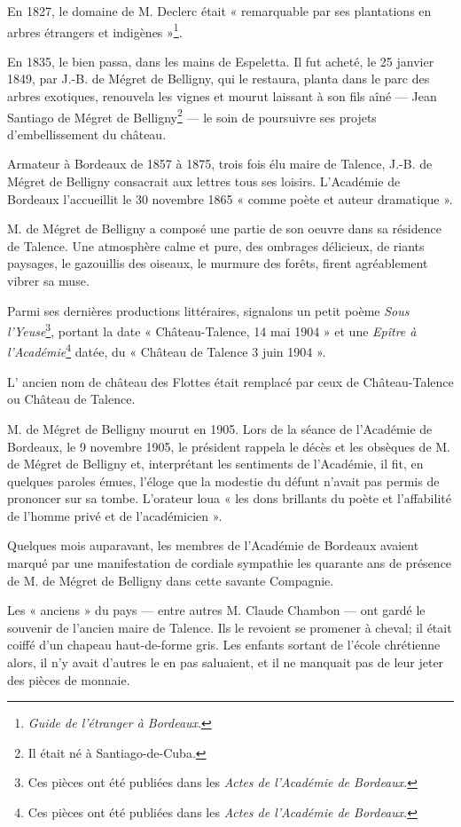 En 1827, le domaine de M. Declerc était « remarquable par ses plantations en arbres étrangers et indigènes »\footnote{\textit{Guide de l'étranger à Bordeaux}.}.

En 1835, le bien passa, dans les mains de Espeletta. Il fut acheté, le 25 janvier 1849, par J.-B. de Mégret de Belligny, qui le restaura, planta dans le parc des arbres exotiques, renouvela les vignes et mourut laissant à son fils aîné — Jean Santiago de Mégret de Belligny\footnote{Il était né à Santiago-de-Cuba.} — le soin de poursuivre ses projets d'embellissement du château.

Armateur à Bordeaux de 1857 à 1875, trois fois élu maire de Talence, J.-B. de Mégret de Belligny consacrait aux lettres tous ses loisirs. L'Académie de Bordeaux l'accueillit le 30 novembre 1865 « comme poète et auteur dramatique ».

M. de Mégret de Belligny a composé une partie de son oeuvre dans sa résidence de Talence. Une atmosphère calme et pure, des ombrages délicieux, de riants paysages, le gazouillis des oiseaux, le murmure des forêts, firent agréablement vibrer sa muse.

Parmi ses dernières productions littéraires, signalons un petit poème \textit{Sous l'Yeuse}\footnote{Ces pièces ont été publiées dans les \textit{Actes de l'Académie de Bordeaux}.}, portant la date « Château-Talence, 14 mai 1904 » et une \textit{Epître à l'Académie}\footnote{Ces pièces ont été publiées dans les \textit{Actes de l'Académie de Bordeaux}.} datée, du « Château de Talence 3 juin 1904 ».

L' ancien nom de château des Flottes était remplacé par ceux de Château-Talence ou Château de Talence.

M. de Mégret de Belligny mourut en 1905. Lors de la séance de l'Académie de Bordeaux, le 9 novembre 1905, le président rappela le décès et les obsèques de M. de Mégret de Belligny et, interprétant les sentiments de l'Académie, il fit, en quelques paroles émues, l'éloge que la modestie du défunt n'avait pas permis de prononcer sur sa tombe. L'orateur loua « les dons brillants du poète et l'affabilité de l'homme privé et de l'académicien ».

Quelques mois auparavant, les membres de l'Académie de Bordeaux avaient marqué par une manifestation de cordiale sympathie les quarante ans de présence de M. de Mégret de Belligny dans cette savante Compagnie.
 
Les « anciens » du pays — entre autres M. Claude Chambon — ont gardé le souvenir de l'ancien maire de Talence. Ils le revoient se promener à cheval; il était coiffé d'un chapeau haut-de-forme gris. Les enfants sortant de l'école chrétienne alors, il n'y avait d'autres le en pas saluaient, et il ne manquait pas de leur jeter des pièces de monnaie.
 
